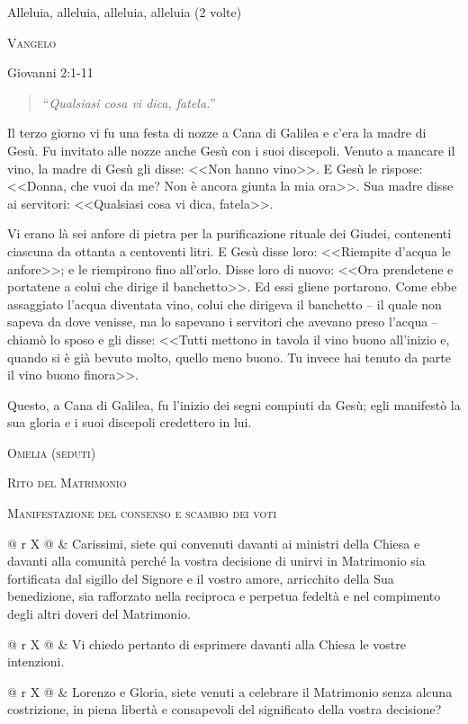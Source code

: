 \documentclass[12pt,twoside]{article}
\makeatletter
\newcommand{\htwo}[1]{{\Large\scshape #1}}
\newcommand{\masspart}[1]{\bigskip

  \htwo{#1}}
\newcommand{\masssubpart}[1]{\bigskip

  {\large\scshape #1}}
\newcommand{\sayline}[2]{
  \begin{tabularx}{\textwidth}{@{} r X @{}}
    \makebox[6.0em][r]{\ifx&#1& #1 \else \textit{#1:} \fi} & #2
\end{tabularx}}
\newcommand{\reading}[1]{#1}
\newcommand{\readingquote}[1]{
\begin{quote}
``\textit{#1}''
\end{quote}
}
\makeatother
\begin{document}
{Alleluia, alleluia, alleluia, alleluia (2 volte)

\newpage

\masssubpart{Vangelo}

\reading{Giovanni 2:1-11}
\readingquote{Qualsiasi cosa vi dica, fatela.}

Il terzo giorno vi fu una festa di nozze a Cana di Galilea e c'era la madre di Gesù. Fu invitato alle nozze anche Gesù con i suoi discepoli. Venuto a mancare il vino, la madre di Gesù gli disse: <<Non hanno vino>>. E Gesù le rispose: <<Donna, che vuoi da me? Non è ancora giunta la mia ora>>. Sua madre disse ai servitori: <<Qualsiasi cosa vi dica, fatela>>.

Vi erano là sei anfore di pietra per la purificazione rituale dei Giudei, contenenti ciascuna da ottanta a centoventi litri. E Gesù disse loro: <<Riempite d'acqua le anfore>>; e le riempirono fino all'orlo. Disse loro di nuovo: <<Ora prendetene e portatene a colui che dirige il banchetto>>. Ed essi gliene portarono. Come ebbe assaggiato l'acqua diventata vino, colui che dirigeva il banchetto -- il quale non sapeva da dove venisse, ma lo sapevano i servitori che avevano preso l'acqua -- chiamò lo sposo e gli disse: <<Tutti mettono in tavola il vino buono all'inizio e, quando si è già bevuto molto, quello meno buono. Tu invece hai tenuto da parte il vino buono finora>>.

Questo, a Cana di Galilea, fu l'inizio dei segni compiuti da Gesù; egli manifestò la sua gloria e i suoi discepoli credettero in lui.


\masssubpart{Omelia (seduti)}

\newpage

\masspart{Rito del Matrimonio}

\masssubpart{Manifestazione del consenso e scambio dei voti}

\sayline{Celebrante}{Carissimi, siete qui convenuti davanti ai ministri della Chiesa e davanti alla comunità perché la vostra decisione di unirvi in Matrimonio sia fortificata dal sigillo del Signore e il vostro amore, arricchito della Sua benedizione, sia rafforzato nella reciproca e perpetua fedeltà e nel compimento degli altri doveri del Matrimonio.}

\sayline{}{Vi chiedo pertanto di esprimere davanti alla Chiesa le vostre intenzioni.}

\sayline{}{Lorenzo e Gloria, siete venuti a celebrare il Matrimonio senza alcuna costrizione, in piena libertà e consapevoli del significato della vostra decisione?}

}
\end{document}
